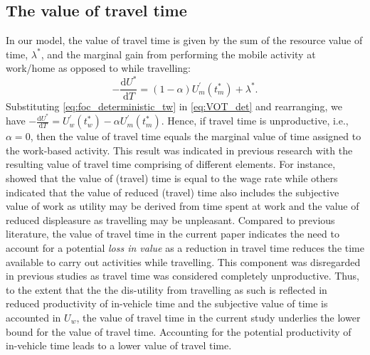 \documentclass[12pt,a4paper,british]{article}
\begin{document}
\subsection*{The value of travel time}
In our model, the value of travel time is given by the sum of the resource value of time, $\lambda^{\ast}$, and the marginal gain from performing the mobile activity at work/home as opposed to while travelling:
\begin{equation}
-\frac{\mathrm{d}U^{\ast}}{\mathrm{d}T}  = \left(1 - \alpha\right) U_{m}^{\prime}\left(t_{m}^{\ast}\right) + \lambda^{\ast}.
\label{eq:VOT_det}
\end{equation}
Substituting \eqref{eq:foc_deterministic_tw} in \eqref{eq:VOT_det} and rearranging, we have  $-\frac{\mathrm{d}U^{\ast}}{\mathrm{d}T}  = U_{w}^{\prime}\left(t_{w}^{\ast}\right) - \alpha U_{m}^{\prime}\left(t_{m}^{\ast}\right)$. Hence, if travel time is unproductive, i.e., $\alpha=0$, then the value of travel time equals the marginal value of time assigned to the work-based activity. This result was indicated in previous research \citep[e.g.][]{Becker1965TheoryAllocationTime,Johnson1966TravelTimePrice,Oort1969EvaluationTravellingTime,DeSerpa1971TheoryEconomicsTime} with the resulting value of travel time comprising of different elements. For instance, \citet{Becker1965TheoryAllocationTime}  showed that the value of (travel) time is equal to the wage rate while others indicated that the value of reduced (travel) time also includes the subjective value of work \citep{Johnson1966TravelTimePrice} as  utility may be derived from time spent at work and the value of reduced displeasure \citep{Oort1969EvaluationTravellingTime} as travelling may be unpleasant. Compared to previous literature, the value of travel time in the current paper indicates the need to account for a potential \textit{loss in value} as a reduction in travel time reduces the time available to carry out activities while travelling. This component was disregarded in previous studies as travel time was considered completely unproductive. Thus, to the extent that the the dis-utility from travelling as such is reflected in reduced productivity of in-vehicle time and the subjective value of time is accounted in $U_w$, the value of travel time in the current study underlies the lower bound for the value of travel time. Accounting for the potential productivity of in-vehicle time leads to a lower value of travel time.

\end{document}
